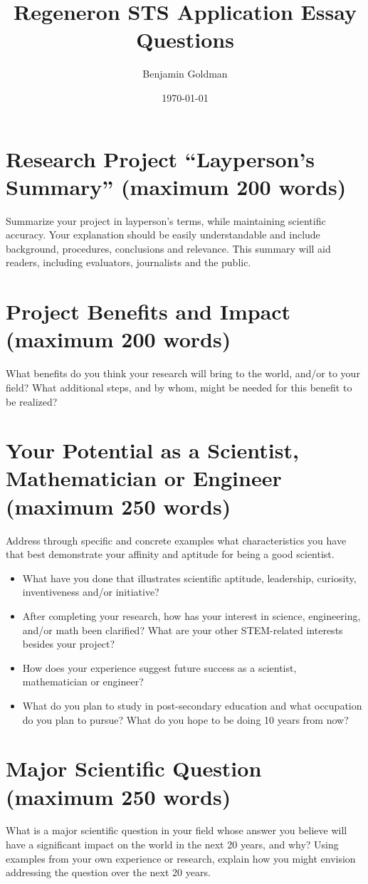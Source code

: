 \documentclass[11pt]{article}
\author{Benjamin Goldman}
\date{\today}
\title{Regeneron STS Application Essay Questions}
\begin{document}
\maketitle

\section{Research Project “Layperson’s Summary” (maximum 200 words)}
\label{sec:org3b34335}
Summarize your project in layperson’s terms, while maintaining scientific accuracy. Your explanation should be easily understandable and include background, procedures, conclusions and relevance. This summary will aid readers, including evaluators, journalists and the public.


\section{Project Benefits and Impact (maximum 200 words)}
\label{sec:org8665bc4}
What benefits do you think your research will bring to the world, and/or to your field? What additional steps, and by whom, might be needed for this benefit to be realized?


\section{Your Potential as a Scientist, Mathematician or Engineer (maximum 250 words)}
\label{sec:orgd6d85d8}
Address through specific and concrete examples what characteristics you have that best demonstrate your affinity and aptitude for being a good scientist.
\begin{itemize}
\item What have you done that illustrates scientific aptitude, leadership, curiosity, inventiveness and/or initiative?
\item After completing your research, how has your interest in science, engineering, and/or math been clarified? What are your other STEM-related interests besides your project?
\item How does your experience suggest future success as a scientist, mathematician or engineer?
\item What do you plan to study in post-secondary education and what occupation do you plan to pursue?  What do you hope to be doing 10 years from now?
\end{itemize}


\section{Major Scientific Question (maximum 250 words)}
\label{sec:org3b74cef}
What is a major scientific question in your field whose answer you believe will have a significant impact on the world in the next 20 years, and why? Using examples from your own experience or research, explain how you might envision addressing the question over the next 20 years.
\end{document}
